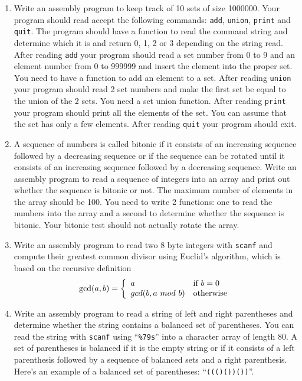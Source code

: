 \documentclass[11pt,b5paper]{book}
\begin{document}
\begin{enumerate}
    \item Write an assembly program to keep track of 10 sets of size 1000000.
    Your program should read accept the following commands: {\tt add}, {\tt union}, {\tt print} and {\tt quit}.
    The program should have a function to read the command string and determine which it is and return
    0, 1, 2 or 3 depending on the string read.
    After reading {\tt add} your program should read a set number from 0 to 9 and an element number
    from 0 to 999999 and insert the element into the proper set.
    You need to have a function to add an element to a set.
    After reading {\tt union} your program should read 2 set numbers and make the first set be equal to the
    union of the 2 sets.
    You need a set union function.
    After reading {\tt print} your program should print all the elements of the set.
    You can assume that the set has only a few elements.
    After reading {\tt quit} your program should exit.
    
    \item A sequence of numbers is called bitonic if it consists of an increasing sequence followed by
    a decreasing sequence or if the sequence can be rotated until it consists of an increasing sequence
    followed by a decreasing sequence.
    Write an assembly program to read a sequence of integers into an array and print out whether the
    sequence is bitonic or not.
    The maximum number of elements in the array should be 100.
    You need to write 2 functions: one to read the numbers into the array and a second to determine
    whether the sequence is bitonic.
    Your bitonic test should not actually rotate the array.
    
    \item Write an assembly program to read two 8 byte integers with {\tt scanf} and compute their
    greatest common divisor using Euclid's algorithm, which is based on the recursive definition
    $$\text{gcd}(a,b) = \left\{
       \begin{array}{l l}
           a & \text{if $b = 0$} \\
           gcd(b, a\ mod\ b) & \text{otherwise}
       \end{array}
        \right.
    $$
    
    \item Write an assembly program to read a string of left and right parentheses and determine
    whether the string contains a balanced set of parentheses.
    You can read the string with {\tt scanf} using ``{\tt \%79s}'' into a character array of
    length 80.
    A set of parentheses is balanced if it is the empty string or if it consists
    of a left parenthesis followed by a sequence of balanced sets and a right parenthesis.
    Here's an example of a balanced set of parentheses: ``{\tt ((()())())}''.
    
\end{enumerate}
\end{document}
